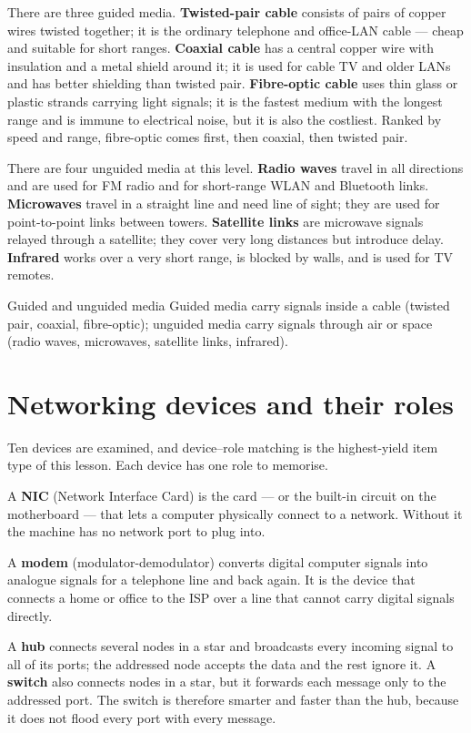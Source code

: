 There are three guided media. \textbf{Twisted-pair cable} consists of pairs
of copper wires twisted together; it is the ordinary telephone and office-LAN
cable --- cheap and suitable for short ranges. \textbf{Coaxial cable} has a
central copper wire with insulation and a metal shield around it; it is used
for cable TV and older LANs and has better shielding than twisted pair.
\textbf{Fibre-optic cable} uses thin glass or plastic strands carrying light
signals; it is the fastest medium with the longest range and is immune to
electrical noise, but it is also the costliest. Ranked by speed and range,
fibre-optic comes first, then coaxial, then twisted pair.

There are four unguided media at this level. \textbf{Radio waves} travel in
all directions and are used for FM radio and for short-range WLAN and
Bluetooth links. \textbf{Microwaves} travel in a straight line and need line
of sight; they are used for point-to-point links between towers.
\textbf{Satellite links} are microwave signals relayed through a satellite;
they cover very long distances but introduce delay. \textbf{Infrared} works
over a very short range, is blocked by walls, and is used for TV remotes.

\begin{definitionbox}{Guided and unguided media}
Guided media carry signals inside a cable (twisted pair, coaxial,
fibre-optic); unguided media carry signals through air or space (radio
waves, microwaves, satellite links, infrared).
\end{definitionbox}

\section{Networking devices and their roles}
Ten devices are examined, and device--role matching is the highest-yield item
type of this lesson. Each device has one role to memorise.

A \textbf{NIC} (Network Interface Card) is the card --- or the built-in
circuit on the motherboard --- that lets a computer physically connect to a
network. Without it the machine has no network port to plug into.

A \textbf{modem} (modulator-demodulator) converts digital computer signals
into analogue signals for a telephone line and back again. It is the device
that connects a home or office to the ISP over a line that cannot carry
digital signals directly.

A \textbf{hub} connects several nodes in a star and broadcasts every
incoming signal to all of its ports; the addressed node accepts the data and
the rest ignore it. A \textbf{switch} also connects nodes in a star, but it
forwards each message only to the addressed port. The switch is therefore
smarter and faster than the hub, because it does not flood every port with
every message.

